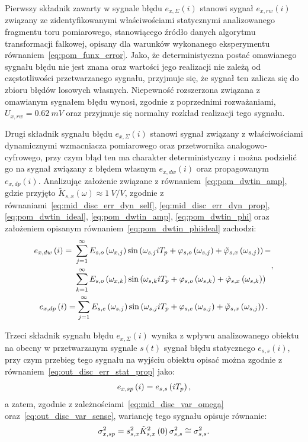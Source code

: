 Pierwszy składnik zawarty w sygnale błędu $e_{x,\Sigma}(i)$ stanowi sygnał $e_{x,rw}(i)$ związany ze zidentyfikowanymi właściwościami statycznymi analizowanego fragmentu toru pomiarowego, stanowiącego źródło danych algorytmu transformacji falkowej, opisany dla warunków wykonanego eksperymentu równaniem~\eqref{eq:pom_funx_error}. Jako, że deterministyczna postać omawianego sygnału błędu nie jest znana oraz wartości jego realizacji nie zależą od częstotliwości przetwarzanego sygnału, przyjmuje się, że sygnał ten zalicza się do zbioru błędów losowych własnych. Niepewność rozszerzona związana z omawianym sygnałem błędu wynosi, zgodnie z poprzednimi rozważaniami, $U_{x,rw} = \qty{0.62}{mV}$ oraz przyjmuje się normalny rozkład realizacji tego sygnału.

Drugi składnik sygnału błędu $e_{x,\Sigma}(i)$ stanowi sygnał związany z właściwościami dynamicznymi wzmacniacza pomiarowego oraz przetwornika analogowo-cyfrowego, przy czym błąd ten ma charakter deterministyczny i można podzielić go na sygnał związany z błędem własnym $e_{x,dw}(i)$ oraz propagowanym $e_{x,dp}(i)$. Analizując założenie związane z równaniem~\eqref{eq:pom_dwtin_amp}, gdzie przyjęto $\tilde{K}_{s,x}(\omega) \approx \qty{1}{V \per V}$, zgodnie z równaniami~\eqref{eq:mid_disc_err_dyn_self}, \eqref{eq:mid_disc_err_dyn_prop}, \eqref{eq:pom_dwtin_ideal}, \eqref{eq:pom_dwtin_amp}, \eqref{eq:pom_dwtin_phi} oraz założeniem opisanym równaniem~\eqref{eq:pom_dwtin_phiideal} zachodzi:
\begin{gather}
\begin{split}
e_{x,dw} \left(i\right) =~
& \sum _{j = 1} ^{\infty} E_{s,o} \left(\omega_{x,j}\right) \sin \left( \omega_{s,j} iT_{p} + \varphi_{s,o} \left(\omega_{s,j}\right) + \tilde{\varphi}_{s,x} \left(\omega_{s,j}\right) \right) - \\
& \sum _{k = 1} ^{\infty} E_{s,o} \left(\omega_{x,k}\right) \sin \left( \omega_{s,k} iT_{p} + \varphi_{s,o} \left(\omega_{s,k}\right) + \dot{\varphi}_{s,x} \left(\omega_{s,k}\right) \right)
\end{split}
\label{eq:pom_errx_dyn_self}, \\
e_{x,dp} \left(i\right) = \sum _{j = 1} ^{\infty} E_{s,e} \left(\omega_{s,j}\right) \sin \left( \omega_{s,j} iT_{p} + \varphi_{s,e} \left(\omega_{s,j}\right) + \tilde{\varphi}_{s,x} \left(\omega_{s,j}\right) \right) \label{eq:pom_errx_dyn_prop}.
\end{gather}

Trzeci składnik sygnału błędu $e_{x,\Sigma}(i)$ wynika z wpływu analizowanego obiektu na obecny w przetwarzanym sygnale $s(t)$ sygnał błędu statycznego $e_{s,s}(i)$, przy czym przebieg tego sygnału na wyjściu obiektu opisać można zgodnie z równaniem~\eqref{eq:out_disc_err_stat_prop} jako:
\begin{equation}
e_{x,sp} \left(i\right) = e_{s,s} \left(i T_{p}\right) \label{eq:pom_errx_stat_prop},
\end{equation}
a zatem, zgodnie z zależnościami~\eqref{eq:mid_disc_var_omega} oraz~\eqref{eq:out_disc_var_sense}, wariancję tego sygnału opisuje równanie:
\begin{equation}
\sigma_{x,sp}^{2} = s_{s,x}^{2} \tilde{K}_{s,x}^{2} \left(0\right) \sigma_{s,s}^{2} \cong \sigma_{s,s}^{2} \label{eq:pom_varx_stat_prop}.
\end{equation}


